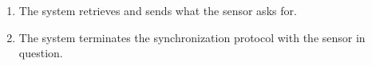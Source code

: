 \begin{usecase}
{\begin{enumerate}
		\end{enumerate}	
		\item
		\begin{enumerate}
			\item The system retrieves and sends what the sensor asks for.
			\item The system terminates the synchronization protocol with the sensor in question.
		\end{enumerate}				
	}
\end{usecase}